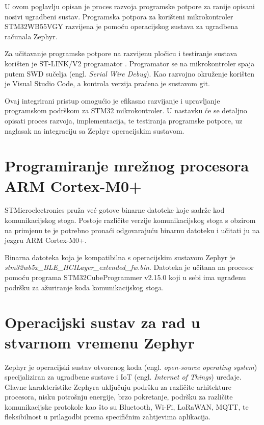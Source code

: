 \documentclass[../diplomski_rad.tex]{subfiles}
\begin{document}
\sloppy

\justifying

U ovom poglavlju opisan je proces razvoja programske potpore za ranije opisani nosivi ugradbeni sustav. 
Programska potpora za korišteni mikrokontroler STM32WB55VGY razvijena je pomoću operacijskog sustava 
za ugradbena računala Zephyr.

Za učitavanje programske potpore na razvijenu pločicu i testiranje sustava korišten je ST-LINK/V2 programator \cite{stm32programator}. 
Programator se na mikrokontroler spaja putem SWD sučelja (engl. \textit{Serial Wire Debug}). 
Kao razvojno okruženje korišten je Visual Studio Code, a kontrola verzija praćena je sustavom git.

Ovaj integrirani pristup omogućio je efikasno razvijanje i upravljanje programskom podrškom za STM32 mikrokontroler. 
U nastavku će se detaljno opisati proces razvoja, implementacija, te testiranja programske potpore, 
uz naglasak na integraciju sa Zephyr operacijskim sustavom.

\section{Programiranje mrežnog procesora ARM Cortex-M0+}

STMicroelectronics pruža već gotove binarne datoteke \cite{kodovi_M0} koje sadrže kod komunikacijskog stoga. 
Postoje različite verzije komunikacijskog stoga s obzirom na primjenu te je potrebno pronaći odgovarajuću 
binarnu datoteku i učitati ju na jezgru ARM Cortex-M0+.

Binarna datoteka koja je kompatibilna s operacijskim sustavom Zephyr je \textit{stm32wb5x\_BLE\_HCILayer\_extended\_fw.bin}.
Datoteka je učitana na procesor pomoću programa STM32CubeProgrammer v2.15.0 
koji u sebi ima ugrađenu podršku za ažuriranje koda komunikacijskog stoga. 

\section{Operacijski sustav za rad u stvarnom vremenu Zephyr}

Zephyr je operacijski sustav otvorenog koda (engl. \textit{open-source operating system}) specijaliziran za ugradbene sustave 
i IoT (engl. \textit{Internet of Things}) uređaje.
Glavne karakteristike Zephyra uključuju podršku za različite arhitekture procesora, 
nisku potrošnju energije, brzo pokretanje, podršku za različite komunikacijske protokole kao što su 
Bluetooth, Wi-Fi, LoRaWAN, MQTT, te fleksibilnost u prilagodbi prema specifičnim zahtjevima aplikacija.
\end{document}
